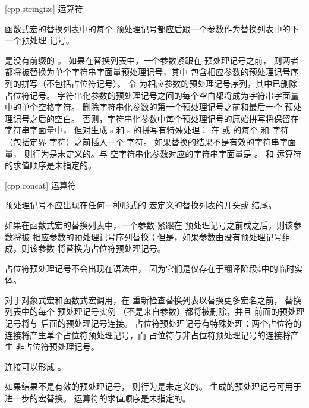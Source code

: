     [cpp.stringize]{\tcode{\#} 运算符}%
    
    \pnum
    函数式宏的替换列表中的每个
    \tcode{\#}
    预处理记号都应后跟一个参数作为替换列表中的下一个预处理
    记号。
    
    \pnum
     是没有前缀的 。
    如果在替换列表中，一个参数紧跟在
    \tcode{\#}
    预处理记号之前，
    则两者都将被替换为单个字符串字面量预处理记号，其中
    包含相应参数的预处理记号序列的拼写（不包括占位符记号）。
    令  为相应参数的预处理记号序列，其中已删除占位符记号。
    字符串化参数的预处理记号之间的每个空白都将成为字符串字面量中的单个空格字符。
    删除字符串化参数的第一个预处理记号之前和最后一个
    预处理记号之后的空白。
    否则，字符串化参数中每个预处理记号的原始拼写将保留在字符串字面量中，
    但对生成 s 和 s 的拼写有特殊处理：
    在  或  的每个
    和
    \tcode{\textbackslash}
    字符（包括定界
    字符）之前插入一个
    \tcode{\textbackslash}
    字符。
    如果替换的结果不是有效的字符串字面量，
    则行为是未定义的。与
    空字符串化参数对应的字符串字面量是 。
    \tcode{\#}
    和
    \tcode{\#\#}
    运算符的求值顺序是未指定的。
    
    [cpp.concat]{\tcode{\#\#} 运算符}%
    
    \pnum
    \tcode{\#\#}
    预处理记号不应出现在任何一种形式的
    宏定义的替换列表的开头或
    结尾。
    
    \pnum
    如果在函数式宏的替换列表中，一个参数
    紧跟在 \tcode{\#\#}
    预处理记号之前或之后，则该参数将被
    相应参数的预处理记号序列替换；但是，如果参数由没有预处理记号组成，则该参数
    将替换为占位符预处理记号。
    \begin{footnote}
    占位符预处理记号不会出现在语法中，
    因为它们是仅存在于翻译阶段4中的临时实体。
    \end{footnote}
    
    \pnum
    对于对象式宏和函数式宏调用，在
    重新检查替换列表以替换更多宏名之前，
    替换列表中的每个
    \tcode{\#\#}
    预处理记号实例
    （不是来自参数）都将被删除，并且
    前面的预处理记号将与
    后面的预处理记号连接。
    占位符预处理记号有特殊处理：两个占位符的连接将产生单个占位符预处理记号，而
    占位符与非占位符预处理记号的连接将产生
    非占位符预处理记号。
    \begin{note}
    连接可以形成
    。
    \end{note}
    如果结果不是有效的预处理记号，
    则行为是未定义的。
    生成的预处理记号可用于进一步的宏替换。
    \tcode{\#\#}
    运算符的求值顺序是未指定的。
    
